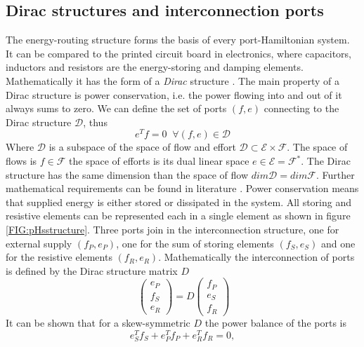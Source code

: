 \documentclass[a4paper,twoside, openright,12pt]{report}
\begin{document}
\subsection{Dirac structures and interconnection ports} \label{SS:PHSinterconnection}
The energy-routing structure forms the basis of every port-Hamiltonian system. It can be compared to the printed circuit board in electronics, where capacitors, inductors and resistors are the energy-storing and damping elements. Mathematically it has the form of a \emph{Dirac} structure \cite{vanderSchaft_06}. The main property of a Dirac structure is power conservation, i.e. the power flowing into and out of it always sums to zero. We can define the set of ports $(f,e)$ connecting to the Dirac structure $\mathcal{D}$, thus 
\begin{equation}
e^Tf = 0 \;  \; \forall (f,e)\in\mathcal{D}
\end{equation}
Where $\mathcal{D}$ is a subspace of the space of flow and effort $\mathcal{D} \subset \mathcal{E}\times \mathcal{F}$. The space of flows is $f \in \mathcal{F}$ the space of efforts is its dual linear space $e \in \mathcal{E} = \mathcal{F}^*$. The Dirac structure has the same dimension than the space of flow $dim \mathcal{D} = dim \mathcal{F}$.
Further mathematical requirements can be found in literature \cite{vanderSchaft_06,Schaft_14}. Power conservation means that supplied energy is either stored or dissipated in the system. All storing and resistive elements can be represented each in a single element as shown in figure \ref{FIG:pHsstructure}. Three ports join in the interconnection structure, one for external supply $(f_P,e_P)$, one for the sum of storing elements $(f_S,e_S)$ and one for the resistive elements $(f_R,e_R)$. Mathematically the  interconnection of ports is defined by the Dirac structure matrix $D$
\begin{equation}\
\begin{pmatrix}
e_P \\ f_S \\ e_R
\end{pmatrix} = D \begin{pmatrix}
f_P \\ e_S \\ f_R
\end{pmatrix}
\end{equation}
It can be shown that for a skew-symmetric $D$ the power balance of the ports is
\begin{equation}
e_S^Tf_S + e_P^Tf_P + e_R^Tf_R = 0,
\end{equation}
\end{document}
